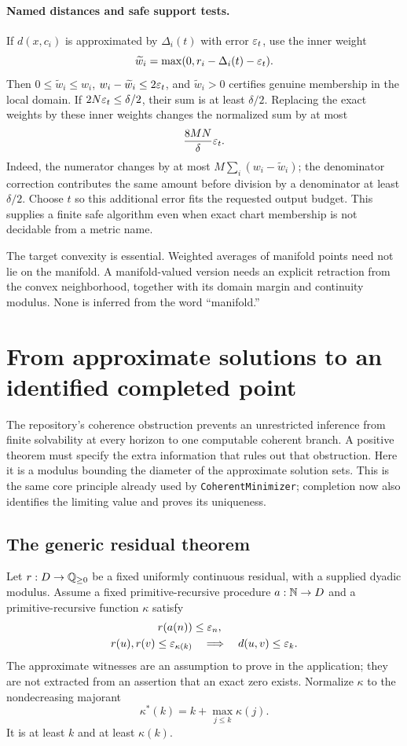 \paragraph{Named distances and safe support tests.}
If $d(x,c_i)$ is approximated by $\Delta_i(t)$ with error
$\varepsilon_t$, use the inner weight
\[
 \widetilde w_i=\max(0,r_i-\Delta_i(t)-\varepsilon_t).
\]
Then $0\le\widetilde w_i\le w_i$,
$w_i-\widetilde w_i\le2\varepsilon_t$, and
$\widetilde w_i>0$ certifies genuine membership in the local domain.
If $2N\varepsilon_t\le\delta/2$, their sum is at least $\delta/2$.
Replacing the exact weights by these inner weights changes the
normalized sum by at most
\[
 \frac{8MN}{\delta}\varepsilon_t.
\]
Indeed, the numerator changes by at most
$M\sum_i(w_i-\widetilde w_i)$; the denominator correction contributes
the same amount before division by a denominator at least $\delta/2$.
Choose $t$ so this additional error fits the requested output budget.
This supplies a finite safe algorithm even when exact chart membership
is not decidable from a metric name.

The target convexity is essential.  Weighted averages of manifold
points need not lie on the manifold.  A manifold-valued version needs
an explicit retraction from the convex neighborhood, together with its
domain margin and continuity modulus.  None is inferred from the
word ``manifold.''

\section{From approximate solutions to an identified completed point}
\label{sec:residual-recovery}

The repository's coherence obstruction prevents an unrestricted
inference from finite solvability at every horizon to one computable
coherent branch.  A positive theorem must specify the extra information
that rules out that obstruction.  Here it is a modulus bounding the
diameter of the approximate solution sets.  This is the same core
principle already used by \texttt{CoherentMinimizer}; completion now
also identifies the limiting value and proves its uniqueness.

\subsection{The generic residual theorem}

Let $r:D\to\mathbb Q_{\ge0}$ be a fixed uniformly continuous residual, with
a supplied dyadic modulus.  Assume a fixed primitive-recursive
procedure $a:\mathbb N\to D$ and a primitive-recursive function $\kappa$
satisfy
\begin{align}
 r(a(n))&\le\varepsilon_n,\label{eq:an-residual-witness}\\
 r(u),r(v)\le\varepsilon_{\kappa(k)}
 &\quad\Longrightarrow\quad d(u,v)\le\varepsilon_k.
 \label{eq:an-diameter}
\end{align}
The approximate witnesses are an assumption to prove in the application;
they are not extracted from an assertion that an exact zero exists.
Normalize $\kappa$ to the nondecreasing majorant
\[
 \kappa^*(k)=k+\max_{j\le k}\kappa(j).
\]
It is at least $k$ and at least $\kappa(k)$.

